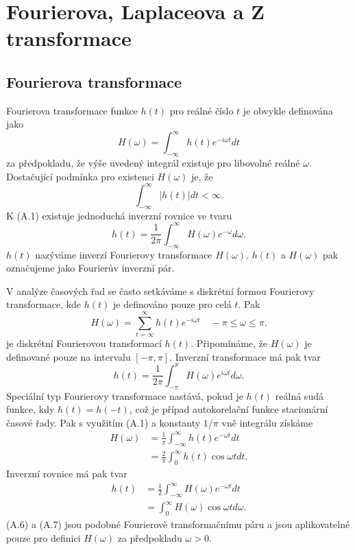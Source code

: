 \chapter{Fourierova, Laplaceova a Z transformace}

\section{Fourierova transformace}

Fourierova transformace funkce $h(t)$ pro reálné číslo $t$ je obvykle definována jako
\begin{equation}
H(\omega) = \int_{-\infty}^{\infty} h(t) e^{-i \omega t} dt
\end{equation}
za předpokladu, že výše uvedený integrál existuje pro libovolné reálné $\omega$. Dostačující podmínka pro existenci $H(\omega)$ je, že
\begin{equation}
\int_{-\infty}^{\infty} |h(t)| dt < \infty.
\end{equation}
K (A.1) existuje jednoduchá inverzní rovnice ve tvaru
\begin{equation}
h(t) = \frac{1}{2 \pi} \int_{-\infty}^{\infty} H(\omega) e^{- \omega} d \omega.
\end{equation}
$h(t)$ nazýváme inverzí Fourierovy transformace $H(\omega)$. $h(t)$ a $H(\omega)$ pak označujeme jako Fourierův inverzní pár.

V analýze časových řad se často setkáváme s diskrétní formou Fourierovy transformace, kde $h(t)$ je definováno pouze pro celá $t$. Pak
\begin{equation}
H(\omega) = \sum_{t = \infty}^{\infty} h(t) e^{-i \omega t} \quad - \pi \le \omega \le \pi.
\end{equation}
je diskrétní Fourierovou transformací $h(t)$. Připomínáme, že $H(\omega)$ je definované pouze na intervalu $[-\pi, \pi]$. Inverzní transformace má pak tvar
\begin{equation}
h(t) = \frac{1}{2 \pi} \int_{-\pi}^\pi H(\omega) e^{i \omega t} d \omega.
\end{equation}
Speciální typ Fourierovy transformace nastává, pokud je $h(t)$ reálná sudá funkce, kdy $h(t) = h(-t)$, což je případ autokorelační funkce stacionární časové řady. Pak s využitím (A.1) a konstanty $1/\pi$ vně integrálu získáme
\begin{align}
H(\omega) & = \frac{1}{\pi}\int_{-\infty}^{\infty} h(t) e^{- \omega t} dt\\ \nonumber
 & = \frac{2}{\pi}\int_0^{\infty} h(t) \cos \omega t dt.
\end{align}
Inverzní rovnice má pak tvar
\begin{align}
h(t) & = \frac{1}{2} \int_{-\infty}^{\infty} H(\omega) e^{- \omega t} dt\\ \nonumber
 & = \int_0^{\infty} H(\omega) \cos \omega t d \omega.
\end{align}
(A.6) a (A.7) jsou podobné Fourierově transformačnímu páru a jsou aplikovatelné pouze pro definici $H(\omega)$ za předpokladu $\omega > 0$.


